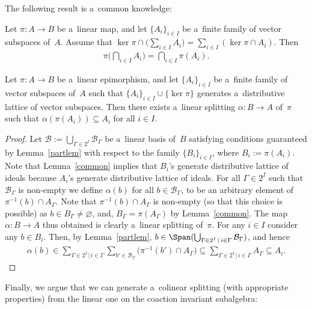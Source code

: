 The following result is a~common knowledge:
\begin{lemma}
\label{common}
Let $\pi:A\rightarrow B$ be a~linear map, and let $\{A_i\}_{i\in I}$ be a~finite family of vector subspaces of~$A$.
Assume that $\ker\pi\cap\Big(\sum\limits_{i\in I}A_i\Big)=\sum\limits_{i\in I}(\ker\pi\cap A_i)$.
Then
\begin{gather*}
\pi\bigg(\bigcap_{i\in I}A_i\bigg)=\bigcap_{i\in I}\pi(A_i).
\end{gather*}
\end{lemma}

\begin{lemma}
\label{splitcoinv}
Let $\pi:A\rightarrow B$ be a~linear epimorphism, and let $\{A_i\}_{i\in I}$ be a~finite family of vector subspaces
of~$A$ such that $\{A_i\}_{i\in I}\cup\{\ker\pi\}$ generates a~distributive lattice of vector subspaces.
Then there exists a~linear splitting $\alpha:B\rightarrow A$ of~$\pi$ such that $\alpha(\pi(A_i))\subseteq A_i$ for all
$i\in I$.
\end{lemma}
\begin{proof}
Let $\mathcal{B}:=\bigcup_{\Gamma\in 2^I}\mathcal{B}_\Gamma$ be a~linear basis of~$B$ satisfying conditions guaranteed
by Lemma~\ref{partlem} with respect to the family $\{B_i\}_{i\in I}$, where $B_i:=\pi(A_i)$.
Note that Lemma~\ref{common} implies that $B_i$'s generate distributive lattice of ideals because $A_i$'s generate
distributive lattice of ideals.
For all $\Gamma\in2^I$ such that $\mathcal{B}_\Gamma$ is non-empty we def\/ine $\alpha(b)$ for all $b\in
\mathcal{B}_\Gamma$, to be an arbitrary element of $\pi^{-1}(b)\cap A_\Gamma$.
Note that $\pi^{-1}(b)\cap A_\Gamma$ is non-empty (so that this choice is possible) as $b\in B_\Gamma\neq \varnothing$,
and, $B_\Gamma=\pi(A_\Gamma)$ by Lemma~\ref{common}.
The map $\alpha:B\rightarrow A$ thus obtained is clearly a~linear splitting of~$\pi$.
For any $i\in I$ consider any $b\in B_i$.
Then, by Lemma~\ref{partlem}, $b\in\Span(\bigcup_{\Gamma\in 2^I  \, |
\,
i\in\Gamma}\mathcal{B}_\Gamma)$, and hence
\begin{gather*}
\alpha(b)\in\sum\limits_{\Gamma\in 2^I
\,
|
\,
i\in\Gamma}\sum\limits_{b'\in \mathcal{B}_\Gamma}\big(\pi^{-1}(b')\cap A_\Gamma\big) \subseteq\sum\limits_{\Gamma\in
2^I
\,
|
\,
i\in\Gamma}A_\Gamma\subseteq A_i.\tag*{\qed}
\end{gather*}
\renewcommand{\qed}{}
\end{proof}

Finally, we argue that we can generate a~colinear splitting (with appropriate properties) from the linear one on the
coaction invariant subalgebra:

